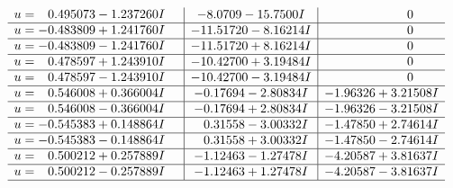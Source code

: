 \documentclass[1p]{elsarticle_modified}
\theoremstyle{definition}
\begin{document}
$$\begin{array}{c|c|c}
\begin{aligned}
u &= \phantom{-}0.495073 - 1.237260 I\end{aligned}
 & -8.0709 - 15.7500 I & \phantom{-0.000000 } 0 \\ \hline\begin{aligned}
u &= -0.483809 + 1.241760 I\end{aligned}
 & -11.51720 - 8.16214 I & \phantom{-0.000000 } 0 \\ \hline\begin{aligned}
u &= -0.483809 - 1.241760 I\end{aligned}
 & -11.51720 + 8.16214 I & \phantom{-0.000000 } 0 \\ \hline\begin{aligned}
u &= \phantom{-}0.478597 + 1.243910 I\end{aligned}
 & -10.42700 + 3.19484 I & \phantom{-0.000000 } 0 \\ \hline\begin{aligned}
u &= \phantom{-}0.478597 - 1.243910 I\end{aligned}
 & -10.42700 - 3.19484 I & \phantom{-0.000000 } 0 \\ \hline\begin{aligned}
u &= \phantom{-}0.546008 + 0.366004 I\end{aligned}
 & -0.17694 - 2.80834 I & -1.96326 + 3.21508 I \\ \hline\begin{aligned}
u &= \phantom{-}0.546008 - 0.366004 I\end{aligned}
 & -0.17694 + 2.80834 I & -1.96326 - 3.21508 I \\ \hline\begin{aligned}
u &= -0.545383 + 0.148864 I\end{aligned}
 & \phantom{-}0.31558 - 3.00332 I & -1.47850 + 2.74614 I \\ \hline\begin{aligned}
u &= -0.545383 - 0.148864 I\end{aligned}
 & \phantom{-}0.31558 + 3.00332 I & -1.47850 - 2.74614 I \\ \hline\begin{aligned}
u &= \phantom{-}0.500212 + 0.257889 I\end{aligned}
 & -1.12463 - 1.27478 I & -4.20587 + 3.81637 I \\ \hline\begin{aligned}
u &= \phantom{-}0.500212 - 0.257889 I\end{aligned}
 & -1.12463 + 1.27478 I & -4.20587 - 3.81637 I\\
 \hline 
 \end{array}$$\newpage
\end{document}
